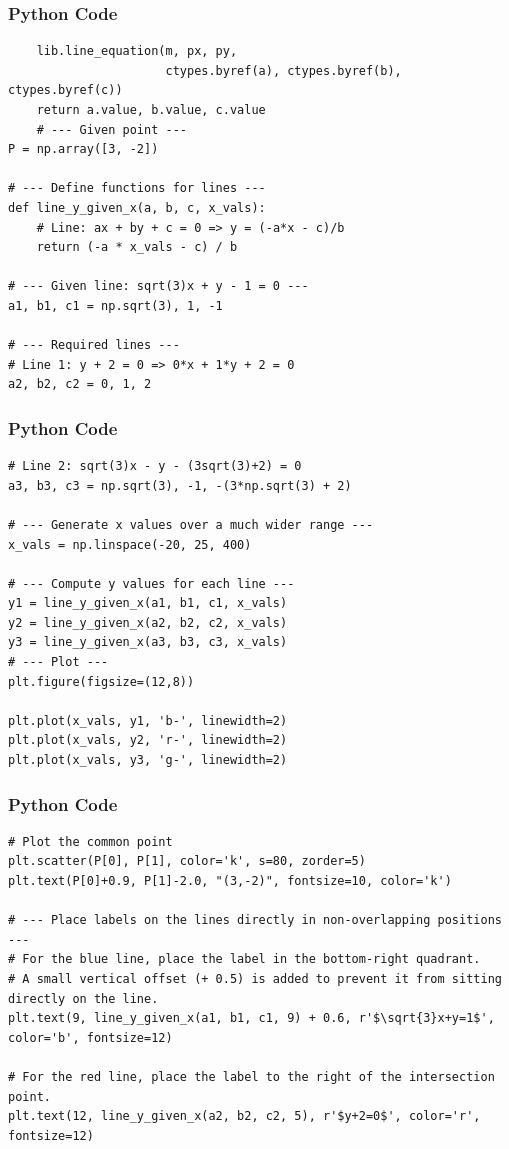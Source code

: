 \documentclass{beamer}
\begin{document}
\begin{frame}[fragile]
    \frametitle{Python Code}
    \begin{lstlisting}
    lib.line_equation(m, px, py,
                      ctypes.byref(a), ctypes.byref(b), ctypes.byref(c))
    return a.value, b.value, c.value
    # --- Given point ---
P = np.array([3, -2])

# --- Define functions for lines ---
def line_y_given_x(a, b, c, x_vals):
    # Line: ax + by + c = 0 => y = (-a*x - c)/b
    return (-a * x_vals - c) / b

# --- Given line: sqrt(3)x + y - 1 = 0 ---
a1, b1, c1 = np.sqrt(3), 1, -1

# --- Required lines ---
# Line 1: y + 2 = 0 => 0*x + 1*y + 2 = 0
a2, b2, c2 = 0, 1, 2
    \end{lstlisting}
\end{frame}


\begin{frame}[fragile]
    \frametitle{Python Code}
    \begin{lstlisting}
# Line 2: sqrt(3)x - y - (3sqrt(3)+2) = 0
a3, b3, c3 = np.sqrt(3), -1, -(3*np.sqrt(3) + 2)

# --- Generate x values over a much wider range ---
x_vals = np.linspace(-20, 25, 400)

# --- Compute y values for each line ---
y1 = line_y_given_x(a1, b1, c1, x_vals)
y2 = line_y_given_x(a2, b2, c2, x_vals)
y3 = line_y_given_x(a3, b3, c3, x_vals)
# --- Plot ---
plt.figure(figsize=(12,8))

plt.plot(x_vals, y1, 'b-', linewidth=2)
plt.plot(x_vals, y2, 'r-', linewidth=2)
plt.plot(x_vals, y3, 'g-', linewidth=2)
    \end{lstlisting}
\end{frame}


\begin{frame}[fragile]
    \frametitle{Python Code}
    \begin{lstlisting}
# Plot the common point
plt.scatter(P[0], P[1], color='k', s=80, zorder=5)
plt.text(P[0]+0.9, P[1]-2.0, "(3,-2)", fontsize=10, color='k')

# --- Place labels on the lines directly in non-overlapping positions ---
# For the blue line, place the label in the bottom-right quadrant.
# A small vertical offset (+ 0.5) is added to prevent it from sitting directly on the line.
plt.text(9, line_y_given_x(a1, b1, c1, 9) + 0.6, r'$\sqrt{3}x+y=1$', color='b', fontsize=12)

# For the red line, place the label to the right of the intersection point.
plt.text(12, line_y_given_x(a2, b2, c2, 5), r'$y+2=0$', color='r', fontsize=12)
    \end{lstlisting}
\end{frame}
\end{document}
